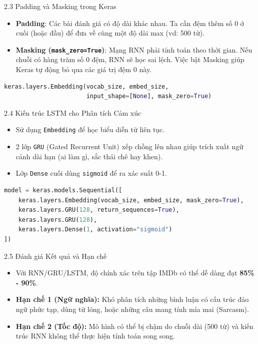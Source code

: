 \documentclass[aspectratio=169, 12pt]{beamer}
\begin{document}
\begin{frame}[fragile]{2.3 Padding và Masking trong Keras}
    \begin{itemize}
        \item \textbf{Padding}: Các bài đánh giá có độ dài khác nhau. Ta cần đệm thêm số 0 ở cuối (hoặc đầu) để đưa về cùng một độ dài max (vd: 500 từ).
        \item \textbf{Masking (\texttt{mask\_zero=True})}: Mạng RNN phải tính toán theo thời gian. Nếu chuỗi có hàng trăm số 0 đệm, RNN sẽ học sai lệch. Việc bật Masking giúp Keras tự động bỏ qua các giá trị đệm 0 này.
    \end{itemize}
\begin{lstlisting}[language=Python]
keras.layers.Embedding(vocab_size, embed_size, 
                       input_shape=[None], mask_zero=True)
\end{lstlisting}
\end{frame}

\begin{frame}[fragile]{2.4 Kiến trúc LSTM cho Phân tích Cảm xúc}
    \begin{itemize}
        \item Sử dụng \texttt{Embedding} để học biểu diễn từ liên tục.
        \item 2 lớp \texttt{GRU} (Gated Recurrent Unit) xếp chồng lên nhau giúp trích xuất ngữ cảnh dài hạn (ai làm gì, sắc thái chê hay khen).
        \item Lớp \texttt{Dense} cuối dùng \texttt{sigmoid} để ra xác suất 0-1.
    \end{itemize}
\begin{lstlisting}[language=Python]
model = keras.models.Sequential([
    keras.layers.Embedding(vocab_size, embed_size, mask_zero=True),
    keras.layers.GRU(128, return_sequences=True),
    keras.layers.GRU(128),
    keras.layers.Dense(1, activation="sigmoid")
])
\end{lstlisting}
\end{frame}

\begin{frame}{2.5 Đánh giá Kết quả và Hạn chế}
    \begin{itemize}
        \item Với RNN/GRU/LSTM, độ chính xác trên tập IMDb có thể dễ dàng đạt \textbf{85\% - 90\%}.
        \item \textbf{Hạn chế 1 (Ngữ nghĩa):} Khó phân tích những bình luận có cấu trúc đảo ngữ phức tạp, dùng từ lóng, hoặc những câu mang tính mỉa mai (Sarcasm).
        \item \textbf{Hạn chế 2 (Tốc độ):} Mô hình có thể bị chậm do chuỗi dài (500 từ) và kiến trúc RNN không thể thực hiện tính toán song song.
    \end{itemize}
\end{frame}
\end{document}
